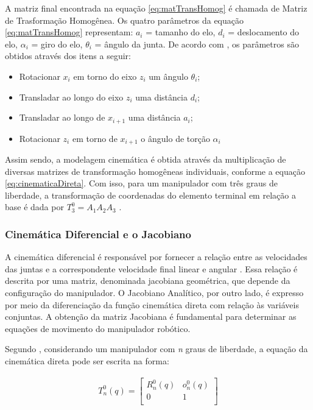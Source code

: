 A matriz final encontrada na equação \ref{eq:matTransHomog} é chamada de Matriz de
Trasformação Homogênea. Os quatro parâmetros da equação \ref{eq:matTransHomog} 
representam: $a_i$ = tamanho do elo, $d_i$ = deslocamento do elo, 
$\alpha_i$ = giro do elo, $\theta_i$ = ângulo da junta. De acordo com 
, os parâmetros são obtidos através dos itens a seguir:

\begin{itemize}
  \item Rotacionar $x_i$ em torno do eixo $z_{i}$ um ângulo $\theta_i$;
  \item Transladar ao longo do eixo $z_{i}$ uma distância $d_i$;
  \item Transladar ao longo de $x_{i+1}$ uma distância $a_i$; 
  \item Rotacionar $z_i$ em torno de $x_{i+1}$ o ângulo de torção $\alpha_i$
\end{itemize}

Assim sendo, a modelagem cinemática é obtida através da multiplicação de diversas
matrizes de transformação homogêneas individuais, conforme a equação 
\ref{eq:cinematicaDireta}. Com isso, para um manipulador com três graus de 
liberdade, a transformação de coordenadas do elemento terminal em relação a base é
dada por $T^0_3=A_1A_2A_3$ .

\subsubsection{Cinemática Diferencial e o Jacobiano}

A cinemática diferencial é responsável por fornecer a relação entre as velocidades das juntas
e a correspondente velocidade final linear e angular \cite{siciliano}. Essa relação é descrita por uma matriz, 
denominada jacobiana geométrica, que depende da configuração do manipulador. O Jacobiano Analítico, 
por outro lado, é expresso por meio da diferenciação da função cinemática direta com relação às variáveis conjuntas.
A obtenção da matriz Jacobiana é fundamental para determinar as equações de movimento do manipulador robótico.

Segundo , considerando um manipulador com \textit{n} graus de liberdade, a equação da cinemática direta 
pode ser escrita na forma:

\begin{equation}
  \begin{gathered}
    T^{0}_n(q) = \begin{bmatrix}
     R^{0}_n(q) & o^{0}_n(q)\\
     0 & 1\\
    \end{bmatrix}
  \end{gathered}
  \label{eq:cinematicaDireta_2}
\end{equation}

